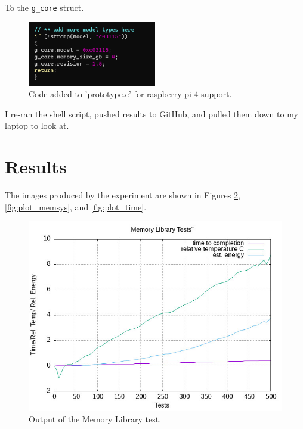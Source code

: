 \documentclass[12pt]{article}
\begin{document}
To the \verb|g_core| struct.

\begin{figure}[h]
\centering
\includegraphics[width=0.5\textwidth]{prototype_edit.png} %
\caption{Code added to 'prototype.c' for raspberry pi 4 support.}
\label{fig:prototype_edit}
\end{figure}

I re-ran the shell script, pushed results to GitHub, and pulled them down to my laptop to look at.

\section{Results}\label{sec:results}

The images produced by the experiment are shown in Figures \ref{fig:plot_memlib}, \ref{fig:plot_memsys}, and \ref{fig:plot_time}.

\begin{figure}[htbp]
\centering
\includegraphics[width=1.0\textwidth]{../../data/ee_course/plot_memlib.jpg} %
\caption{Output of the Memory Library test.}
\label{fig:plot_memlib}
\end{figure}
\end{document}
